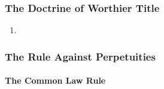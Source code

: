 \subsubsection{The Doctrine of Worthier Title}

\begin{enumerate}
    \item %
\end{enumerate}

\subsubsection{The Rule Against Perpetuities}

\paragraph{The Common Law Rule}

